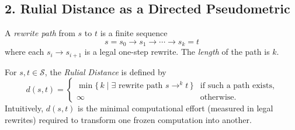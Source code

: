 \subsection*{2. Rulial Distance as a Directed Pseudometric}

\begin{definition}
A \emph{rewrite path} from $s$ to $t$ is a finite sequence
\[
s = s_0 \to s_1 \to \cdots \to s_k = t
\]
where each $s_i \to s_{i+1}$ is a legal one-step rewrite. The \emph{length} of the path is $k$.
\end{definition}

\begin{definition}
For $s, t \in \mathcal{S}$, the \emph{Rulial Distance} is defined by
\[
d(s,t) =
\begin{cases}
\min \{\, k \mid \exists \text{ rewrite path } s \to^k t \,\} & \text{if such a path exists}, \\[4pt]
\infty & \text{otherwise.}
\end{cases}
\]
Intuitively, $d(s,t)$ is the minimal computational effort (measured in legal rewrites) required to transform one frozen computation into another.
\end{definition}

